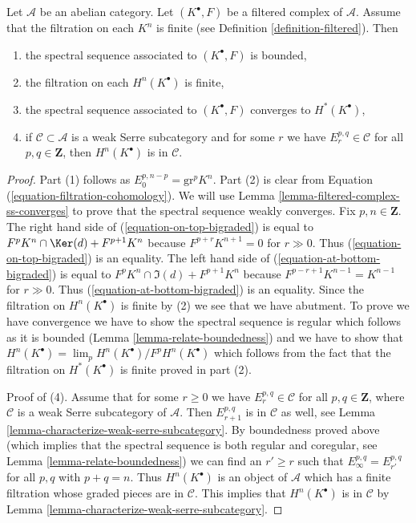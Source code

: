 \begin{lemma}
\label{lemma-biregular-ss-converges}
Let $\mathcal{A}$ be an abelian category. Let $(K^\bullet, F)$ be a
filtered complex of $\mathcal{A}$. Assume that the filtration on each $K^n$
is finite (see Definition \ref{definition-filtered}). Then
\begin{enumerate}
\item the spectral sequence associated to $(K^\bullet, F)$ is bounded,
\item the filtration on each $H^n(K^\bullet)$ is finite,
\item the spectral sequence associated to $(K^\bullet, F)$ converges
to $H^*(K^\bullet)$,
\item if $\mathcal{C} \subset \mathcal{A}$ is a weak Serre subcategory
and for some $r$ we have $E_r^{p, q} \in \mathcal{C}$ for all
$p, q \in \mathbf{Z}$, then $H^n(K^\bullet)$ is in $\mathcal{C}$.
\end{enumerate}
\end{lemma}

\begin{proof}
Part (1) follows as $E_0^{p, n - p} = \text{gr}^p K^n$.
Part (2) is clear from Equation (\ref{equation-filtration-cohomology}).
We will use Lemma \ref{lemma-filtered-complex-ss-converges} to prove
that the spectral sequence weakly converges. Fix $p, n \in \mathbf{Z}$.
The right hand side of (\ref{equation-on-top-bigraded})
is equal to $F^pK^n \cap \Ker(d) + F^{p + 1}K^n$ because
$F^{p + r}K^{n + 1} = 0$ for $r \gg 0$. Thus (\ref{equation-on-top-bigraded})
is an equality. The left hand side of (\ref{equation-at-bottom-bigraded})
is equal to $F^pK^n \cap \Im(d) + F^{p + 1}K^n$ because
$F^{p - r + 1}K^{n - 1} = K^{n - 1}$ for $r \gg 0$.
Thus (\ref{equation-at-bottom-bigraded}) is an equality. Since the filtration
on $H^n(K^\bullet)$ is finite by (2) we see that we have abutment.
To prove we have convergence we have to show the spectral sequence is
regular which follows as it is bounded
(Lemma \ref{lemma-relate-boundedness}) and we have
to show that $H^n(K^\bullet) = \lim_p H^n(K^\bullet)/F^pH^n(K^\bullet)$
which follows from the fact that the filtration on $H^*(K^\bullet)$
is finite proved in part (2).

\medskip\noindent
Proof of (4). Assume that for some $r \geq 0$ we have
$E_r^{p, q} \in \mathcal{C}$ for all $p, q \in \mathbf{Z}$, where
$\mathcal{C}$ is a weak Serre subcategory of $\mathcal{A}$. Then $E_{r + 1}^{p, q}$ is
in $\mathcal{C}$ as well, see
Lemma \ref{lemma-characterize-weak-serre-subcategory}.
By boundedness proved above (which implies that the spectral sequence
is both regular and coregular, see Lemma \ref{lemma-relate-boundedness})
we can find an $r' \geq r$ such that $E_\infty^{p, q} = E_{r'}^{p, q}$
for all $p, q$ with $p + q = n$. Thus $H^n(K^\bullet)$ is an object
of $\mathcal{A}$ which has a finite filtration whose graded pieces
are in $\mathcal{C}$. This implies that $H^n(K^\bullet)$ is in $\mathcal{C}$
by Lemma \ref{lemma-characterize-weak-serre-subcategory}.
\end{proof}


